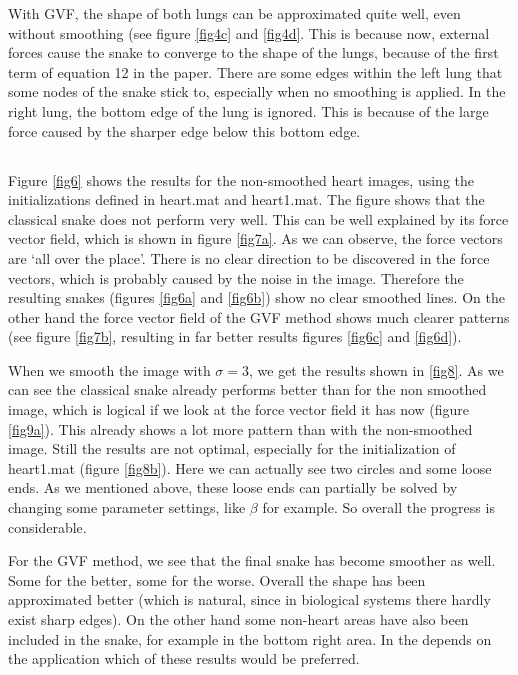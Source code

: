 \documentclass{article}
\begin{document}
With GVF, the shape of both lungs can be approximated quite well, even without smoothing (see figure \ref{fig4c} and \ref{fig4d}. This is because now, external forces cause the snake to converge to the shape of the lungs, because of the first term of equation 12 in the paper. There are some edges within the left lung that some nodes of the snake stick to, especially when no smoothing is applied. In the right lung, the bottom edge of the lung is ignored. This is because of the large force caused by the sharper edge below this bottom edge.

\subsection{}

\subsection{}
Figure \ref{fig6} shows the results for the non-smoothed heart images, using the initializations defined in heart.mat and heart1.mat. The figure shows that the classical snake does not perform very well. This can be well explained by its force vector field, which is shown in figure \ref{fig7a}. As we can observe, the force vectors are `all over the place'. There is no clear direction to be discovered in the force vectors, which is probably caused by the noise in the image. Therefore the resulting snakes (figures \ref{fig6a} and \ref{fig6b}) show no clear smoothed lines.
On the other hand the force vector field of the GVF method shows much clearer patterns (see figure \ref{fig7b}, resulting in far better results figures \ref{fig6c} and \ref{fig6d}).

When we smooth the image with $\sigma=3$, we get the results shown in \ref{fig8}. As we can see the classical snake already performs better than for the non smoothed image, which is logical if we look at the force vector field it has now (figure \ref{fig9a}). This already shows a lot more pattern than with the non-smoothed image. Still the results are not optimal, especially for the initialization of heart1.mat (figure \ref{fig8b}). Here we can actually see two circles and some loose ends. As we mentioned above, these loose ends can partially be solved by changing some parameter settings, like $\beta$ for example. So overall the progress is considerable. 

For the GVF method, we see that the final snake has become smoother as well. Some for the better, some for the worse. Overall the shape has been approximated better (which is natural, since in biological systems there hardly exist sharp edges). On the other hand some non-heart areas have also been included in the snake, for example in the bottom right area. In the depends on the application which of these results would be preferred.
\end{document}
